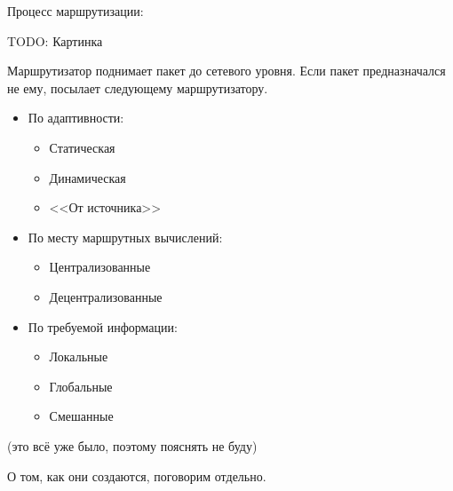 Процесс маршрутизации:

TODO: Картинка

Маршрутизатор поднимает пакет до сетевого уровня. Если пакет предназначался не ему, посылает следующему маршрутизатору.


\begin{itemize}
    \item По адаптивности:
    \begin{itemize}
        \item Статическая
        \item Динамическая
        \item <<От источника>>
    \end{itemize}
    \item По месту маршрутных вычислений:
    \begin{itemize}
        \item Централизованные
        \item Децентрализованные
    \end{itemize}
    \item По требуемой информации:
    \begin{itemize}
        \item Локальные
        \item Глобальные
        \item Смешанные
    \end{itemize}
\end{itemize}

(это всё уже было, поэтому пояснять не буду)


О том, как они создаются, поговорим отдельно.

